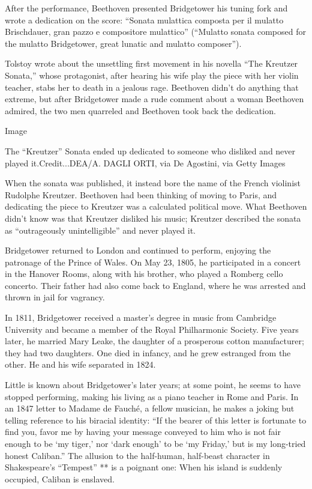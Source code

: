 After the performance, Beethoven presented Bridgetower his tuning fork
and wrote a dedication on the score: ``Sonata mulattica composta per il
mulatto Brischdauer, gran pazzo e compositore mulattico'' (``Mulatto
sonata composed for the mulatto Bridgetower, great lunatic and mulatto
composer'').

Tolstoy wrote about the unsettling first movement in his novella ``The
Kreutzer Sonata,'' whose protagonist, after hearing his wife play the
piece with her violin teacher, stabs her to death in a jealous rage.
Beethoven didn't do anything that extreme, but after Bridgetower made a
rude comment about a woman Beethoven admired, the two men quarreled and
Beethoven took back the dedication.

Image

The ``Kreutzer'' Sonata ended up dedicated to someone who disliked and
never played it.Credit...DEA/A. DAGLI ORTI, via De Agostini, via Getty
Images

When the sonata was published, it instead bore the name of the French
violinist Rudolphe Kreutzer. Beethoven had been thinking of moving to
Paris, and dedicating the piece to Kreutzer was a calculated political
move. What Beethoven didn't know was that Kreutzer disliked his music;
Kreutzer described the sonata as ``outrageously unintelligible'' and
never played it.

Bridgetower returned to London and continued to perform, enjoying the
patronage of the Prince of Wales. On May 23, 1805, he participated in a
concert in the Hanover Rooms, along with his brother, who played a
Romberg cello concerto. Their father had also come back to England,
where he was arrested and thrown in jail for vagrancy.

In 1811, Bridgetower received a master's degree in music from Cambridge
University and became a member of the Royal Philharmonic Society. Five
years later, he married Mary Leake, the daughter of a prosperous cotton
manufacturer; they had two daughters. One died in infancy, and he grew
estranged from the other. He and his wife separated in 1824.

Little is known about Bridgetower's later years; at some point, he seems
to have stopped performing, making his living as a piano teacher in Rome
and Paris. In an 1847 letter to Madame de Fauché, a fellow musician, he
makes a joking but telling reference to his biracial identity: ``If the
bearer of this letter is fortunate to find you, favor me by having your
message conveyed to him who is not fair enough to be `my tiger,' nor
`dark enough' to be `my Friday,' but is my long-tried honest Caliban.''
The allusion to the half-human, half-beast character in Shakespeare's
``Tempest'' ** is a poignant one: When his island is suddenly occupied,
Caliban is enslaved.

